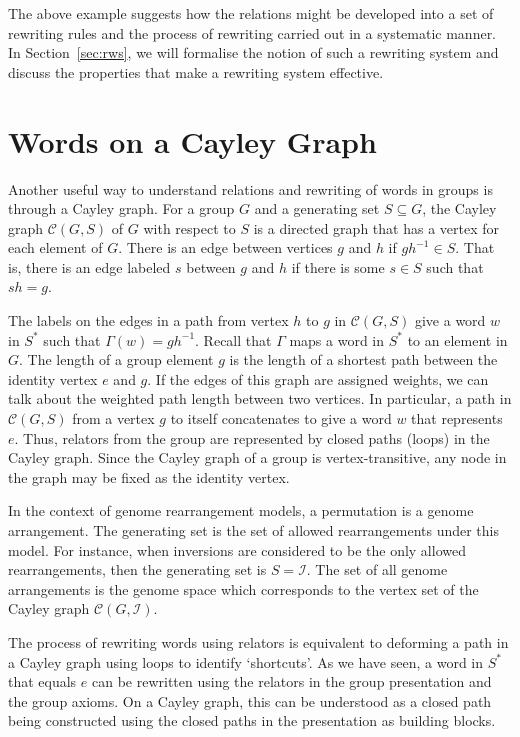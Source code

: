 \documentclass[utf8]{Frontiers_LaTex_Templates/frontiersFPHY} %
\newcommand{\invset}{\mathcal{I}}
\newcommand{\id}{e}
\newcommand{\cayley}{\mathcal{C}}
\numberwithin{equation}{section}
\begin{document}
The above example suggests how the relations might be developed into a set of rewriting rules and the process of rewriting carried out in a systematic manner.  
In Section~\ref{sec:rws}, we will formalise the notion of such a rewriting system and discuss the properties that make a rewriting system effective.

\section{Words on a Cayley Graph}\label{sec:cg}


Another useful way to understand relations and rewriting of words in groups is through a Cayley graph. For a group $G$ and a generating set $S \subseteq G$, the Cayley graph $\cayley(G,S)$ of $G$ with respect to $S$ is a directed graph that has a vertex for each element of $G$.  There is an edge between vertices $g$ and $h$ if $gh^{-1} \in S$. That is, there is an edge labeled $s$ between $g$ and $h$ if there is some $s \in S$ such that $sh = g$. 

The labels on the edges in a path from vertex $h$ to $g$ in $\cayley(G,S)$ give a word $w$ in $S^*$ such that $\Gamma(w) = gh^{-1}$. Recall that $\Gamma$ maps a word in $S^*$ to an element in $G$. The length of a group element $g$ is the length of a shortest path between the identity vertex $\id$ and $g$. If the edges of this graph are assigned weights, we can talk about the weighted path length between two vertices. 
In particular, a path in $\cayley(G,S)$ from a vertex $g$ to itself concatenates to give a word $w$ that represents $\id$.
Thus, relators from the group are represented by closed paths (loops) in the Cayley graph.
Since the Cayley graph of a group is vertex-transitive, any node in the graph may be fixed as the identity vertex.


In the context of genome rearrangement models, a permutation is a genome arrangement. The generating set is the set of allowed rearrangements under this model. For instance, when inversions are considered to be the only allowed rearrangements, then the generating set is $S=\invset$. The set of all genome arrangements is the genome space which corresponds to the vertex set of the Cayley graph $\cayley(G, \invset)$. 


The process of rewriting words using relators is equivalent to deforming a path in a Cayley graph using loops to identify `shortcuts'. As we have seen, a word in $S^*$ that equals $\id$ can be rewritten using the relators in the group presentation and the group axioms. On a Cayley graph, this can be understood as a closed path being constructed using the closed paths in the presentation as building blocks.
\end{document}
